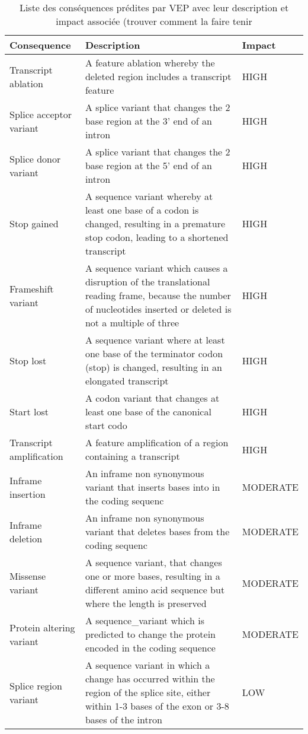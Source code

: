 \documentclass[12pt,twoside]{reedthesis}
\theoremstyle{definition}
\theoremstyle{definition}
\theoremstyle{remark}
\begin{document}
  \newpage        
  
  \begin{table}
  
  \caption{\label{tab:tabvepcsq}Liste des conséquences prédites par VEP avec leur description et impact associée (trouver comment la faire tenir}
  \centering
  \begin{tabular}[t]{lll}
  \toprule
  Consequence & Description & Impact\\
  \midrule
  Transcript ablation & A feature ablation whereby the deleted region includes a transcript feature & HIGH\\
  Splice acceptor variant & A splice variant that changes the 2 base region at the 3' end of an intron & HIGH\\
  Splice donor variant & A splice variant that changes the 2 base region at the 5' end of an intron & HIGH\\
  Stop gained & A sequence variant whereby at least one base of a codon is changed, resulting in a premature stop codon, leading to a shortened transcript & HIGH\\
  Frameshift variant & A sequence variant which causes a disruption of the translational reading frame, because the number of nucleotides inserted or deleted is not a multiple of three & HIGH\\
  \addlinespace
  Stop lost & A sequence variant where at least one base of the terminator codon (stop) is changed, resulting in an elongated transcript & HIGH\\
  Start lost & A codon variant that changes at least one base of the canonical start codo & HIGH\\
  Transcript amplification & A feature amplification of a region containing a transcript & HIGH\\
  Inframe insertion & An inframe non synonymous variant that inserts bases into in the coding sequenc & MODERATE\\
  Inframe deletion & An inframe non synonymous variant that deletes bases from the coding sequenc & MODERATE\\
  \addlinespace
  Missense variant & A sequence variant, that changes one or more bases, resulting in a different amino acid sequence but where the length is preserved & MODERATE\\
  Protein altering variant & A sequence\_variant which is predicted to change the protein encoded in the coding sequence & MODERATE\\
  Splice region variant & A sequence variant in which a change has occurred within the region of the splice site, either within 1-3 bases of the exon or 3-8 bases of the intron & LOW\\

\end{tabular}
\end{table}
\end{document}
